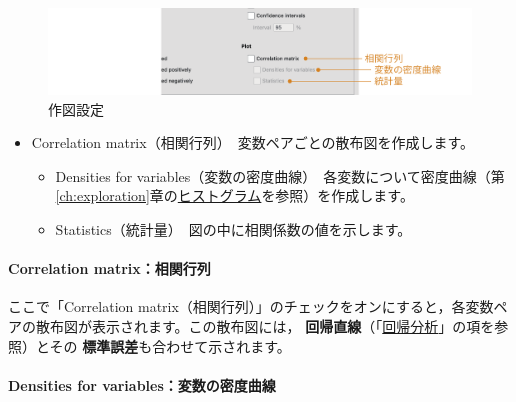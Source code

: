 \documentclass[
  12pt,
  a5jpaper,
  lualatex, ja=standard]{bxjsbook}
\providecommand{\tightlist}{%
  \setlength{\itemsep}{0pt}\setlength{\parskip}{0pt}}
\renewcommand{\emph}[1]{\textbf{\color{emph} #1}}
\newenvironment{jmvsettings}{%
	\begin{center}%
	\begin{tcolorbox}[%
		title=設定項目,
		colframe=gmoji,
		colbacktitle=gmoji,
		colback=gmoji!2!white,
		breakable,
		width=.9\textwidth,
		]\small\addtolength{\leftmargini}{-3\labelsep}%
	}%
	{\end{tcolorbox}\end{center}}
\begin{document}
\begin{figure}[!ht]

{\centering \includegraphics[width=1\linewidth]{images/regression/cor-plot} 

}

\caption{作図設定}\label{fig:regression-cor-plot}
\end{figure}

\begin{jmvsettings}

\begin{itemize}
\tightlist
\item
  Correlation matrix（相関行列）　変数ペアごとの散布図を作成します。

  \begin{itemize}
  \tightlist
  \item
    Densities for variables（変数の密度曲線）　各変数について密度曲線（第\ref{ch:exploration}章の\protect\hyperlink{subsubsub:exp-plots-histograms}{ヒストグラム}を参照）を作成します。
  \item
    Statistics（統計量）　図の中に相関係数の値を示します。
  \end{itemize}
\end{itemize}

\end{jmvsettings}

\hypertarget{correlation-matrixux76f8ux95a2ux884cux5217}{%
\paragraph*{Correlation matrix：相関行列}\label{correlation-matrixux76f8ux95a2ux884cux5217}}

ここで「Correlation matrix（相関行列）」のチェックをオンにすると，各変数ペアの散布図が表示されます。この散布図には，\emph{回帰直線}（「\href{sec:linear}{回帰分析}」の項を参照）とその\emph{標準誤差}も合わせて示されます。

\hypertarget{densities-for-variablesux5909ux6570ux306eux5bc6ux5ea6ux66f2ux7dda}{%
\paragraph*{Densities for variables：変数の密度曲線}\label{densities-for-variablesux5909ux6570ux306eux5bc6ux5ea6ux66f2ux7dda}}
\end{document}
